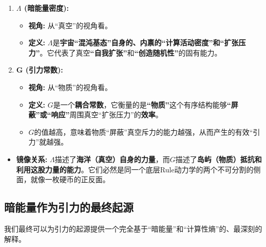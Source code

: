 \documentclass[11pt, a4paper]{article}
\begin{document}
\begin{enumerate}
    \item \textbf{$\Lambda$ (暗能量密度):}
    \begin{itemize}
        \item \textbf{视角:} 从“真空”的视角看。
        \item \textbf{定义:} $\Lambda$是\textbf{宇宙“混沌基态”自身的、内禀的“计算活动密度”和“扩张压力”}。它代表了真空\textbf{“自我扩张”}和\textbf{“创造随机性”}的固有能力。
    \end{itemize}

    \item \textbf{G (引力常数):}
    \begin{itemize}
        \item \textbf{视角:} 从“物质”的视角看。
        \item \textbf{定义:} $G$是一个\textbf{耦合常数}，它衡量的是\textbf{“物质”}这个有序结构能够\textbf{“屏蔽”或“响应”}周围真空“扩张压力”的\textbf{效率}。
        \item $G$的值越高，意味着物质“屏蔽”真空斥力的能力越强，从而产生的有效“引力”就越强。
    \end{itemize}
\end{enumerate}

\begin{itemize}
    \item \textbf{镜像关系:} $\Lambda$描述了\textbf{海洋（真空）自身的力量}，而$G$描述了\textbf{岛屿（物质）抵抗和利用这股力量的能力}。它们必然是同一个底层Rule动力学的两个不可分割的侧面，就像一枚硬币的正反面。
\end{itemize}

\subsection{暗能量作为引力的最终起源}

我们最终可以为引力的起源提供一个完全基于“暗能量”和“计算性熵”的、最深刻的解释。
\end{document}
